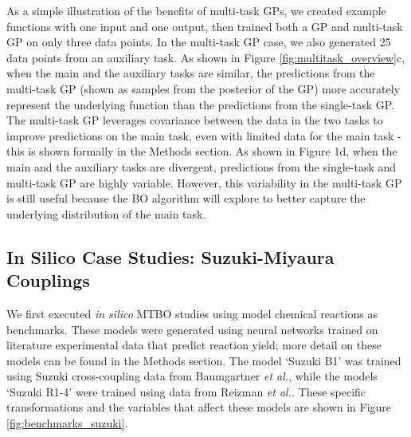As a simple illustration of the benefits of multi-task GPs, we created example functions with one input and one output, then trained both a GP and multi-task GP on only three data points. In the multi-task GP case, we also generated 25 data points from an auxiliary task. As shown in Figure \ref{fig:multitask_overview}c, when the main and the auxiliary tasks are similar, the predictions from the multi-task GP (shown as samples from the posterior of the GP) more accurately represent the underlying function than the predictions from the single-task GP. The multi-task GP leverages covariance between the data in the two tasks to improve predictions on the main task, even with limited data for the main task - this is shown formally in the Methods section. As shown in Figure 1d, when the main and the auxiliary tasks are divergent, predictions from the single-task and multi-task GP are highly variable. However, this variability in the multi-task GP is still useful because the BO algorithm will explore to better capture the underlying distribution of the main task.

\subsection{In Silico Case Studies: Suzuki-Miyaura Couplings}

We first executed \textit{in silico} MTBO studies using model chemical reactions as benchmarks. These models were generated using neural networks trained on literature experimental data that predict reaction yield; more detail on these models can be found in the Methods section. The model `Suzuki B1' was trained using Suzuki cross-coupling data from Baumgartner \textit{et al.},\cite{Baumgartner2018} while the models `Suzuki R1-4' were trained using data from Reizman \textit{et al.}\cite{Reizman2016a}.  These specific transformations and the variables that affect these models are shown in Figure \ref{fig:benchmarks_suzuki}.

